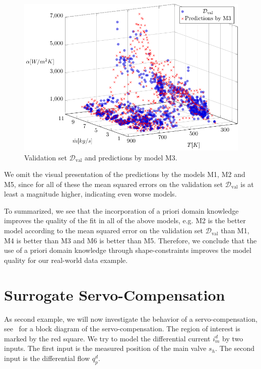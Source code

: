 \begin{figure}[H]
	\centering
	\includegraphics[width=\columnwidth]{graphics/pgfplots/cha5/M3.pdf}
	\caption{Validation set $\mathcal{D}_{\text{val}}$ and predictions by model M3.}
	\label{fig:ebner-M3}
\end{figure}

We omit the visual presentation of the predictions by the models M1, M2 and M5, since for all of these the mean squared errors on the validation set $\mathcal{D}_{\text{val}}$ is at least a magnitude higher, indicating even worse models.

To summarized, we see that the incorporation of a priori domain knowledge improves the quality of the fit in all of the above models, e.g. M2 is the better model according to the mean squared error on the validation set $\mathcal{D}_{\text{val}}$ than M1, M4 is better than M3 and M6 is better than M5. Therefore, we conclude that the use of a priori domain knowledge through shape-constraints improves the model quality for our real-world data example. 

\section{Surrogate Servo-Compensation} \label{sec:real-world-application2}

As second example, we will now investigate the behavior of a servo-compensation, see~ for a block diagram of the servo-compensation. The region of interest is marked by the red square. We try to model the differential current $i_m^d$ by two inputs. The first input is the measured position of the main valve $s_h$. The second input is the differential flow $q_p^d$. 

